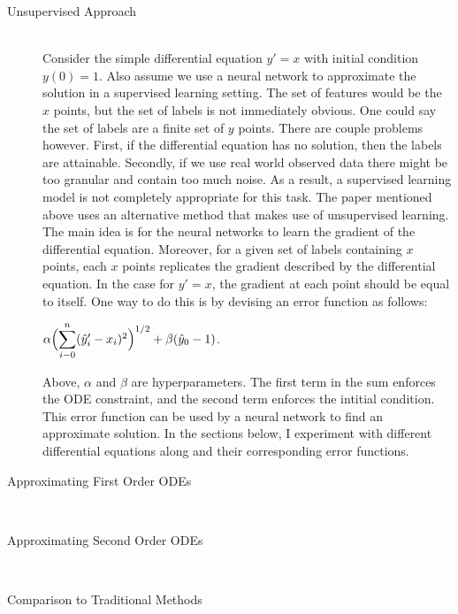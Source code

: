 \documentclass[12pt]{article}
\newcommand{\dsum}[2]{\mathlarger{\sum}_{#1}^{#2}}
\newcommand{\bgc}{\begin{center}}
\newcommand{\enc}{\end{center}}
\begin{document}
\begin{description}
    \item[Unsupervised Approach] \hfill \\
    Consider the simple differential equation $y' = x$ with initial condition
    $y(0) = 1$. Also assume we use a neural network to approximate the solution
    in a supervised learning setting. The set of features would be the $x$
    points, but the set of labels is not immediately obvious. One could say the
    set of labels are a finite set of $y$ points. There are couple problems
    however. First, if the differential equation has no solution, then the
    labels are attainable. Secondly, if we use real world observed data there
    might be too granular and contain too much noise. As a result, a supervised
    learning model is not completely appropriate for this task. The paper
    mentioned above uses an alternative method that makes use of unsupervised
    learning. The main idea is for the neural networks to learn the gradient of
    the differential equation. Moreover, for a given set of labels containing
    $x$ points, each $x$ points replicates the gradient described by the
    differential equation. In the case for $y' = x$, the gradient at each point
    should be equal to itself. One way to do this is by devising an error
    function as follows: 
    \bgc 
    $\alpha\Bigl(\dsum{i-0}{n}(\hat{y}_i' - x_i)^2\Bigr)^{1/2} + \beta(\hat{y}_0 - 1)$.
    \enc
    Above, $\alpha$ and $\beta$ are hyperparameters. The first term in the sum
    enforces the ODE constraint, and the second term enforces the intitial
    condition. This error function can be used by a neural network to find an
    approximate solution. In the sections below, I experiment with different
    differential equations along and their corresponding error functions. 

    \item[Approximating First Order ODEs] \hfill \\
    \item[Approximating Second Order ODEs] \hfill \\
    \item[Comparison to Traditional Methods] \hfill \\
\end{description}
\end{document}
